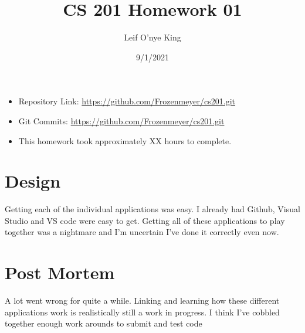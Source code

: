 \documentclass[12pt]{article}
\title{\bfseries CS 201 Homework 01}
\author{Leif O'nye King}
\date{9/1/2021}
\begin{document}
\maketitle


\begin{itemize}
\item Repository Link:
\url{https://github.com/Frozenmeyer/cs201.git}

\item Git Commits:
\url{https://github.com/Frozenmeyer/cs201.git}


\item This homework took approximately XX hours to complete.
\end{itemize}





\section{Design}

Getting each of the individual applications was easy. I already had Github, Visual Studio and VS code were easy to get. Getting all of these applications to play together was a nightmare and I'm uncertain I've  done it correctly even now.





\section{Post Mortem}

A lot went wrong for quite a while. Linking and learning how these different applications work is realistically still a work in progress. I think I've cobbled together enough work arounds to submit and test code
\end{document}
